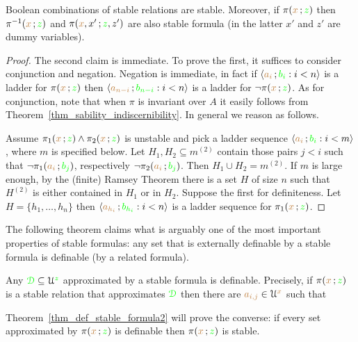 \begin{lemma}\label{lem_stab_Boole}
  Boolean combinations of stable relations are stable.
  Moreover, if $\pi({\color{brown} x}\,;{\color{green} z})$ then  $\pi^{-1}({\color{brown} x}\,;{\color{green} z})$ and $\pi({\color{brown} x},x'\,;{\color{green} z},z')$ are also stable formula (in the latter $x'$ and $z'$ are dummy variables).
\end{lemma}

\begin{proof}
  The second claim is immediate.
  To prove the first, it suffices to consider conjunction and negation.
  Negation is immediate, in fact if $\langle{\color{brown}a_i}\,;{\color{green} b_i} : i<n\rangle$ is a ladder for $\pi({\color{brown} x}\,;{\color{green} z})$ then $\langle{\color{brown}a_{n-i}}\,;{\color{green} b_{n-i}} : i<n\rangle$ is a ladder for $\neg\pi({\color{brown} x}\,;{\color{green} z})$.
  As for conjunction, note that when $\pi$ is invariant over $A$ it easily follows from Theorem~\ref{thm_sability_indiscernibility}.
  In general we reason as follows.

  Assume $\pi_1({\color{brown} x}\,;{\color{green} z})\wedge\pi_2({\color{brown} x}\,;{\color{green} z})$ is unstable and pick a ladder sequence $\langle{\color{brown}a_i}\,;{\color{green} b_i} : i<m\rangle$, where $m$ is specified below.
  Let $H_1,H_2\subseteq m^{(2)}$ contain those pairs $j<i$ such that $\neg\pi_1({\color{brown} a_i}\,;{\color{green} b_j})$, respectively $\neg\pi_2({\color{brown} a_i}\,;{\color{green} b_j})$. 
  Then $H_1\cup H_2= m^{(2)}$. 
  If $m$ is large enough, by the (finite) Ramsey Theorem there is a set $H$ of size $n$ such that $H^{(2)}$ is either contained in $H_1$ or in $H_2$. Suppose the first for definiteness. 
  Let $H=\{h_1,\dots,h_n\}$ then $\langle{\color{brown}a_{h_i}}\,;{\color{green} b_{h_i}} : i<n\rangle$ is a ladder sequence for $\pi_1({\color{brown} x}\,;{\color{green} z})$.
\end{proof}

The following theorem claims what is arguably one of the most important properties of stable formulas: any set that is externally definable by a stable formula is definable (by a related formula).

\begin{theorem}\label{thm_def_stable_formula}
Any ${\color{green}\EuScript D}\subseteq\EuScript U^{\color{green} z}$ approximated by a stable formula is definable.
Precisely, if $\pi({\color{brown} x}\,;{\color{green} z})$ is a stable relation that approximates ${\color{green}\EuScript D}$ then there are ${\color{brown} a_{i,j}}\in\EuScript U^{\color{brown} x}$ such that

\end{theorem}

Theorem~\ref{thm_def_stable_formula2} will prove the converse: if every set approximated by $\pi({\color{brown} x}\,;{\color{green} z})$ is definable then $\pi({\color{brown} x}\,;{\color{green} z})$ is stable.

